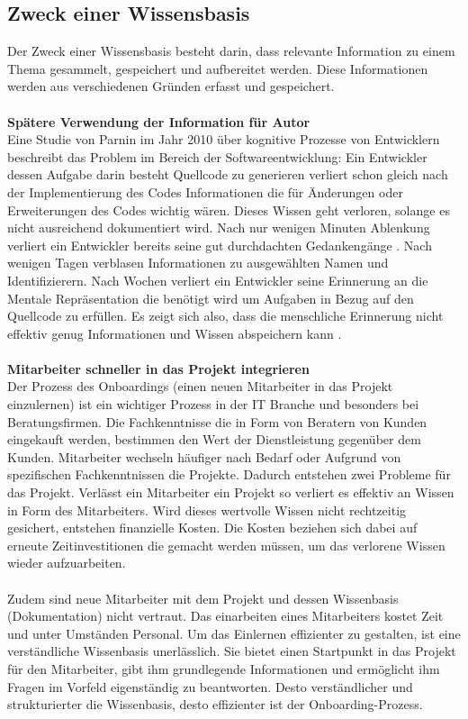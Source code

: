 \documentclass[a4paper,12pt]{scrartcl}
\begin{document}
\subsection{Zweck einer Wissensbasis}
Der Zweck einer Wissensbasis besteht darin, dass relevante Information zu einem Thema gesammelt, gespeichert und aufbereitet werden. Diese Informationen werden aus verschiedenen Gründen erfasst und gespeichert.
\\\\
\textbf{Spätere Verwendung der Information für Autor}\\
Eine Studie von Parnin im Jahr 2010 \cite{Parnin2010} über kognitive Prozesse von Entwicklern beschreibt das Problem im Bereich der Softwareentwicklung: Ein Entwickler dessen Aufgabe darin besteht Quellcode zu generieren verliert schon gleich nach der Implementierung des Codes Informationen die für Änderungen oder Erweiterungen des Codes wichtig wären. Dieses Wissen geht verloren, solange es nicht ausreichend dokumentiert wird. Nach nur wenigen Minuten Ablenkung verliert ein Entwickler bereits seine gut durchdachten Gedankengänge \cite{Graham2004}. Nach wenigen Tagen verblasen Informationen zu ausgewählten Namen und Identifizierern. Nach Wochen verliert ein Entwickler seine Erinnerung an die Mentale Repräsentation die benötigt wird um Aufgaben in Bezug auf den Quellcode zu erfüllen. Es zeigt sich also, dass die menschliche Erinnerung nicht effektiv genug Informationen und Wissen abspeichern kann \cite{Graham2004}.
\\\\
\textbf{Mitarbeiter schneller in das Projekt integrieren}\\
Der Prozess des Onboardings (einen neuen Mitarbeiter in das Projekt einzulernen) ist ein wichtiger Prozess in der IT Branche und besonders bei Beratungsfirmen. Die Fachkenntnisse die in Form von Beratern von Kunden eingekauft werden, bestimmen den Wert der Dienstleistung gegenüber dem Kunden. Mitarbeiter wechseln häufiger nach Bedarf oder Aufgrund von spezifischen Fachkenntnissen die Projekte. Dadurch entstehen zwei Probleme für das Projekt. Verlässt ein Mitarbeiter ein Projekt so verliert es effektiv an Wissen in Form des Mitarbeiters. Wird dieses wertvolle Wissen nicht rechtzeitig gesichert, entstehen finanzielle Kosten. Die Kosten beziehen sich dabei auf erneute Zeitinvestitionen die gemacht werden müssen, um das verlorene Wissen wieder aufzuarbeiten.
\\\\
Zudem sind neue Mitarbeiter mit dem Projekt und dessen Wissenbasis (Dokumentation) nicht vertraut. Das einarbeiten eines Mitarbeiters kostet Zeit und unter Umständen Personal. Um das Einlernen effizienter zu gestalten, ist eine verständliche Wissenbasis unerlässlich. Sie bietet einen Startpunkt in das Projekt für den Mitarbeiter, gibt ihm grundlegende Informationen und ermöglicht ihm Fragen im Vorfeld eigenständig zu beantworten. Desto verständlicher und strukturierter die Wissenbasis, desto effizienter ist der Onboarding-Prozess.   
\end{document}
